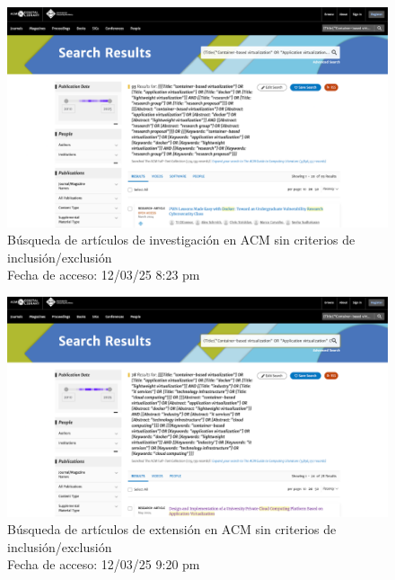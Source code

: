 \begin{figure}[htbp]
    \centering
    \includegraphics[width=\textwidth,keepaspectratio]{apendices/BD/sin-criterios/ACM-inv.png}
    \caption{Búsqueda de artículos de investigación en ACM sin criterios de inclusión/exclusión \\
    Fecha de acceso: 12/03/25 8:23 pm
    }\label{fig:busqueda2}
\end{figure}
\FloatBarrier

\begin{figure}[htbp]
    \centering
    \includegraphics[width=\textwidth,keepaspectratio]{apendices/BD/sin-criterios/ACM-ind.png}
    \caption{Búsqueda de artículos de extensión en ACM sin criterios de inclusión/exclusión \\
    Fecha de acceso: 12/03/25 9:20 pm
    }\label{fig:busqueda3}
\end{figure}
\FloatBarrier

